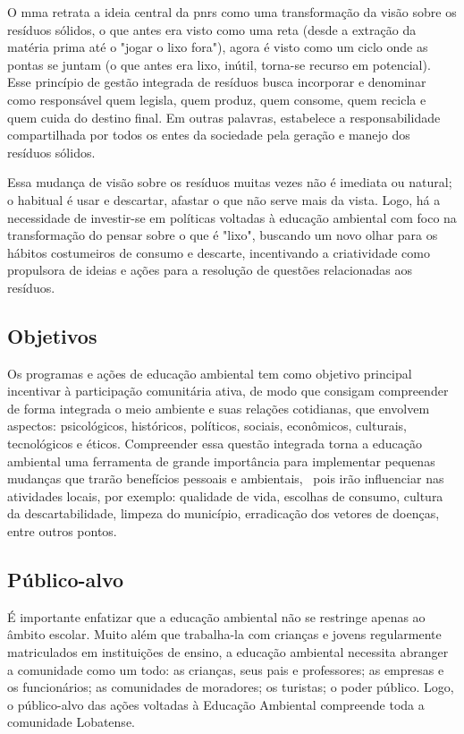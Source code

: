 O \gls{mma} retrata a ideia central da \gls{pnrs} como uma transformação da visão sobre os resíduos sólidos, o que antes era visto como uma reta (desde a extração da matéria prima até o "jogar o lixo fora"), agora é visto como um ciclo onde as pontas se juntam (o que antes era lixo, inútil, torna-se recurso em potencial). Esse princípio de gestão integrada de resíduos busca incorporar e denominar como responsável quem legisla, quem produz, quem consome, quem recicla e quem cuida do destino final. Em outras palavras, estabelece a responsabilidade compartilhada por todos os entes da sociedade pela geração e manejo dos resíduos sólidos. 

Essa mudança de visão sobre os resíduos muitas vezes não é imediata ou natural; o habitual é usar e descartar, afastar o que não serve mais da vista. Logo, há a necessidade de investir-se em políticas voltadas à educação ambiental com foco na transformação do pensar sobre o que é "lixo", buscando um novo olhar para os hábitos costumeiros de consumo e descarte, incentivando a criatividade como propulsora de ideias e ações para a resolução de questões relacionadas aos resíduos. 

\subsection{Objetivos}

Os programas e ações de educação ambiental tem como objetivo principal incentivar à participação comunitária ativa, de modo que consigam compreender de forma integrada o meio ambiente e suas relações cotidianas, que envolvem aspectos: psicológicos, históricos, políticos, sociais, econômicos, culturais, tecnológicos e éticos. Compreender essa questão integrada torna a educação ambiental uma ferramenta de grande importância para implementar pequenas mudanças que trarão benefícios pessoais e ambientais,  pois irão influenciar nas atividades locais, por exemplo: qualidade de vida, escolhas de consumo, cultura da descartabilidade, limpeza do município, erradicação dos vetores de doenças, entre outros pontos.

\subsection{Público-alvo}

É importante enfatizar que a educação ambiental não se restringe apenas ao âmbito escolar. Muito além que trabalha-la com crianças e jovens regularmente matriculados em instituições de ensino, a educação ambiental necessita abranger a comunidade como um todo: as crianças, seus pais e professores; as empresas e os funcionários; as comunidades de moradores; os turistas; o poder público. Logo, o público-alvo das ações voltadas à Educação Ambiental compreende toda a comunidade Lobatense. 

